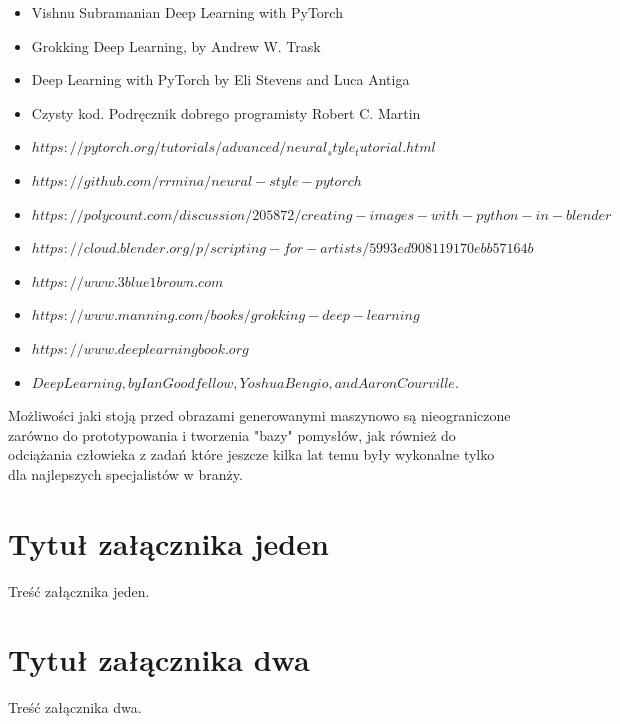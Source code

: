 \documentclass[brudnopis]{xmgr}
\begin{document}
\begin{itemize}
\item Vishnu Subramanian Deep Learning with PyTorch 
\item Grokking Deep Learning, by Andrew W. Trask
\item Deep Learning with PyTorch by Eli Stevens and Luca Antiga
\item Czysty kod. Podręcznik dobrego programisty Robert C. Martin
\item $https://pytorch.org/tutorials/advanced/neural_style_tutorial.html$
\item$ https://github.com/rrmina/neural-style-pytorch$
\item $https://polycount.com/discussion/205872/creating-images-with-python-in-blender$
\item $https://cloud.blender.org/p/scripting-for-artists/5993ed908119170ebb57164b$
\item $https://www.3blue1brown.com$
\item $https://www.manning.com/books/grokking-deep-learning$
\item $https://www.deeplearningbook.org$
\item $Deep Learning, by Ian Goodfellow, Yoshua Bengio, and Aaron Courville.$


\end{itemize}




\summary
Możliwości jaki stoją przed obrazami generowanymi maszynowo są nieograniczone zarówno do prototypowania i tworzenia "bazy" pomysłów, jak również do odciążania człowieka z zadań które jeszcze kilka lat temu były wykonalne tylko dla najlepszych specjalistów w branży.

\appendix
\chapter{Tytuł załącznika jeden}

Treść załącznika jeden.

\chapter{Tytuł załącznika dwa}

Treść załącznika dwa.





\oswiadczenie
\end{document}
